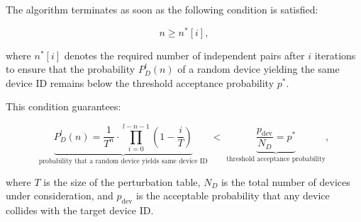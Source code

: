 \documentclass[twocolumn]{report}
\begin{document}
The algorithm \alert{terminates} as soon as the following condition is satisfied:

\vspace{-0.2cm}
\begin{minipage}{\columnwidth}
	\[
		n \ge n^*[i],
	\]
\end{minipage}

where \( n^*[i] \) denotes the required \alert{number of independent pairs} after \( i \) \alert{iterations} to ensure that the \alert{probability} \( P^l_D(n) \) of a random device yielding the same device ID remains below the \alert{threshold acceptance probability} \( p^* \).

%
%
This condition guarantees:
\vspace{-0.8cm}
\begin{center}
	\begin{adjustbox}{max width=\columnwidth}
		\begin{minipage}[t]{0.6\textwidth}
			\[
				\underbrace{
				P_D^l(n)
				=
				\frac{1}{T^n}
				\cdot
				\prod_{i=0}^{l - n - 1}
				\left(1 - \frac{i}{T}\right)
				}_{\text{probability that a random device yields same device ID}}
				\;<\;
				\underbrace{\frac{p_{\text{dev}}}{N_D} = p^*}_{\text{threshold acceptance probability}},
			\]
		\end{minipage}
	\end{adjustbox}
\end{center}
where \( T \) is the \alert{size of the perturbation table}, \( N_D \) is the \alert{total number of devices} under consideration, and \( p_{\text{dev}} \) is the \alert{acceptable probability} that any device collides with the target device ID.
\end{document}
